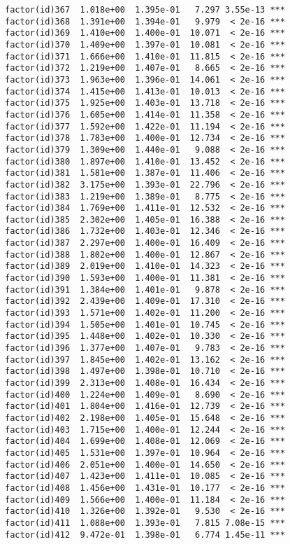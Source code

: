 \documentclass[]{article}
\begin{document}
\begin{verbatim}
factor(id)367  1.018e+00  1.395e-01   7.297 3.55e-13 ***
factor(id)368  1.391e+00  1.394e-01   9.979  < 2e-16 ***
factor(id)369  1.410e+00  1.400e-01  10.071  < 2e-16 ***
factor(id)370  1.409e+00  1.397e-01  10.081  < 2e-16 ***
factor(id)371  1.666e+00  1.410e-01  11.815  < 2e-16 ***
factor(id)372  1.219e+00  1.407e-01   8.665  < 2e-16 ***
factor(id)373  1.963e+00  1.396e-01  14.061  < 2e-16 ***
factor(id)374  1.415e+00  1.413e-01  10.013  < 2e-16 ***
factor(id)375  1.925e+00  1.403e-01  13.718  < 2e-16 ***
factor(id)376  1.605e+00  1.414e-01  11.358  < 2e-16 ***
factor(id)377  1.592e+00  1.422e-01  11.194  < 2e-16 ***
factor(id)378  1.783e+00  1.400e-01  12.734  < 2e-16 ***
factor(id)379  1.309e+00  1.440e-01   9.088  < 2e-16 ***
factor(id)380  1.897e+00  1.410e-01  13.452  < 2e-16 ***
factor(id)381  1.581e+00  1.387e-01  11.406  < 2e-16 ***
factor(id)382  3.175e+00  1.393e-01  22.796  < 2e-16 ***
factor(id)383  1.219e+00  1.389e-01   8.775  < 2e-16 ***
factor(id)384  1.769e+00  1.411e-01  12.532  < 2e-16 ***
factor(id)385  2.302e+00  1.405e-01  16.388  < 2e-16 ***
factor(id)386  1.732e+00  1.403e-01  12.346  < 2e-16 ***
factor(id)387  2.297e+00  1.400e-01  16.409  < 2e-16 ***
factor(id)388  1.802e+00  1.400e-01  12.867  < 2e-16 ***
factor(id)389  2.019e+00  1.410e-01  14.323  < 2e-16 ***
factor(id)390  1.593e+00  1.400e-01  11.381  < 2e-16 ***
factor(id)391  1.384e+00  1.401e-01   9.878  < 2e-16 ***
factor(id)392  2.439e+00  1.409e-01  17.310  < 2e-16 ***
factor(id)393  1.571e+00  1.402e-01  11.200  < 2e-16 ***
factor(id)394  1.505e+00  1.401e-01  10.745  < 2e-16 ***
factor(id)395  1.448e+00  1.402e-01  10.330  < 2e-16 ***
factor(id)396  1.377e+00  1.407e-01   9.783  < 2e-16 ***
factor(id)397  1.845e+00  1.402e-01  13.162  < 2e-16 ***
factor(id)398  1.497e+00  1.398e-01  10.710  < 2e-16 ***
factor(id)399  2.313e+00  1.408e-01  16.434  < 2e-16 ***
factor(id)400  1.224e+00  1.409e-01   8.690  < 2e-16 ***
factor(id)401  1.804e+00  1.416e-01  12.739  < 2e-16 ***
factor(id)402  2.198e+00  1.405e-01  15.648  < 2e-16 ***
factor(id)403  1.715e+00  1.400e-01  12.244  < 2e-16 ***
factor(id)404  1.699e+00  1.408e-01  12.069  < 2e-16 ***
factor(id)405  1.531e+00  1.397e-01  10.964  < 2e-16 ***
factor(id)406  2.051e+00  1.400e-01  14.650  < 2e-16 ***
factor(id)407  1.423e+00  1.411e-01  10.085  < 2e-16 ***
factor(id)408  1.456e+00  1.431e-01  10.177  < 2e-16 ***
factor(id)409  1.566e+00  1.400e-01  11.184  < 2e-16 ***
factor(id)410  1.326e+00  1.392e-01   9.530  < 2e-16 ***
factor(id)411  1.088e+00  1.393e-01   7.815 7.08e-15 ***
factor(id)412  9.472e-01  1.398e-01   6.774 1.45e-11 ***

\end{verbatim}
\end{document}
